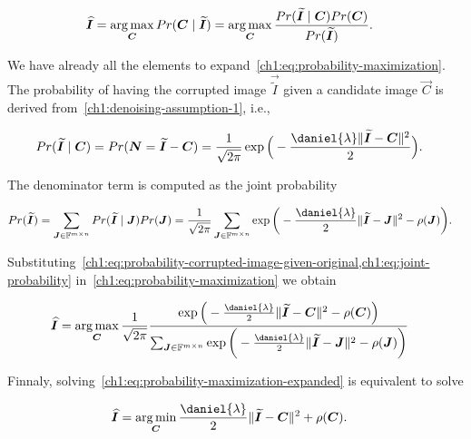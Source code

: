 \begin{align}
	\bm{\widehat{I}} & = \operatorname*{arg\,max} _{\bm{C}}{Pr(\bm{C} \; | \;\bm{\widetilde{I}})} = \operatorname*{arg\,max} _{\bm{C}} \frac{Pr(\bm{\widetilde{I}} \; | \; \bm{C})Pr(\bm{C})}{Pr(\bm{\widetilde{I}})}.
	\label{ch1:eq:probability-maximization}
\end{align}

We have already all the elements to expand~\cref{ch1:eq:probability-maximization}. The probability of having the corrupted image $\vec{\widetilde{I}}$ given a candidate image $\vec{C}$ is derived from~\cref{ch1:denoising-assumption-1}, i.e.,

\begin{align}
	Pr(\vec{\widetilde{I}} \; | \; \vec{C}) &= Pr( \vec{N} = \vec{\widetilde{I}} - \vec{C} ) = \frac{1}{\sqrt{2\pi}}\exp\Big(- \frac{ \daniel{ \lambda }\norm{\vec{\widetilde{I}} - \vec{C} }^2}{2} \Big).
	\label{ch1:eq:probability-corrupted-image-given-original}
\end{align}

The denominator term is computed as the joint probability

\begin{align}
	Pr(\widetilde{\vec{I}}) &= \sum_{\vec{J} \in \mathbb{F}^{m \times n}}{Pr(\vec{\widetilde{I}}\;|\; \vec{J})Pr(\vec{J})} = \frac{1}{\sqrt{2 \pi}}\sum_{\vec{J} \in \mathbb{F}^{m \times n}}{\exp\bigg(-\frac{\daniel{ \lambda }}{2}\norm{\widetilde{\vec{I}}-\vec{J}}^2 - \rho(\vec{J})}\bigg).
	\label{ch1:eq:joint-probability}
\end{align}

Substituting~\cref{ch1:eq:probability-corrupted-image-given-original,ch1:eq:joint-probability} in~\cref{ch1:eq:probability-maximization} we obtain

\begin{align}
	\vec{\widehat{I}} & = \argmax _{\vec{C}} \frac{1}{\sqrt{2\pi}} \frac{\exp\Big(- \frac{\daniel{ \lambda }}{2}\norm{\vec{\widetilde{I}} - \vec{C}}^2 - \rho(\vec{C}) \Big) }{ \sum_{\vec{J} \in \mathbb{F}^{m \times n}}{\exp\bigg(-\frac{\daniel{ \lambda }}{2}\norm{\widetilde{\vec{I}}-\vec{J}}^2 - \rho(\vec{J})}\bigg) }
	\label{ch1:eq:probability-maximization-expanded}
\end{align}

Finnaly, solving~\cref{ch1:eq:probability-maximization-expanded} is equivalent to solve

\begin{align}
	\vec{\widehat{I}} &= \argmin _{\vec{C}} \frac{\daniel{ \lambda }}{2}\norm{\vec{\widetilde{I}} - \vec{C}}^2 + \rho(\vec{C}).
	\label{ch1:eq:minimization-form}
\end{align}

